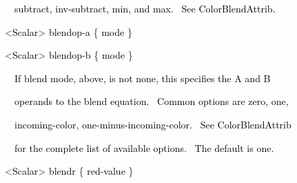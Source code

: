 \documentclass[a4paper]{article}
\newcommand\textstyleOOoComputerKeyWord[1]{\textrm{\textcolor[rgb]{0.0,0.0,0.5019608}{#1}}}
\newcommand\textstyleOOoAssemblerSpecialChar[1]{\textrm{\textcolor[rgb]{0.0,0.5019608,0.0}{#1}}}
\newcommand\textstyleOOoAssemblerIdent[1]{\textrm{\textcolor{black}{#1}}}
\begin{document}
{\color{black}
\textstyleOOoComputerKeyWord{\textcolor{black}{\ \ \ \ subtract, inv-subtract, min, and max. \ See ColorBlendAttrib.}}}


\bigskip

{\color{black}
\textstyleOOoComputerKeyWord{\textcolor{black}{\ \ }}\textstyleOOoAssemblerSpecialChar{{\textless}}\textstyleOOoAssemblerIdent{Scalar}\textstyleOOoAssemblerSpecialChar{{\textgreater}}\textstyleOOoComputerKeyWord{\textcolor{black}{
}}\textstyleOOoAssemblerIdent{blendop}\textstyleOOoAssemblerSpecialChar{{}-}\textstyleOOoAssemblerIdent{a}\textstyleOOoComputerKeyWord{\textcolor{black}{
}}\textstyleOOoAssemblerSpecialChar{\{}\textstyleOOoComputerKeyWord{\textcolor{black}{
}}\textstyleOOoAssemblerIdent{mode}\textstyleOOoComputerKeyWord{\textcolor{black}{
}}\textstyleOOoAssemblerSpecialChar{\}}}

{\color{black}
\textstyleOOoComputerKeyWord{\textcolor{black}{\ \ }}\textstyleOOoAssemblerSpecialChar{{\textless}}\textstyleOOoAssemblerIdent{Scalar}\textstyleOOoAssemblerSpecialChar{{\textgreater}}\textstyleOOoComputerKeyWord{\textcolor{black}{
}}\textstyleOOoAssemblerIdent{blendop}\textstyleOOoAssemblerSpecialChar{{}-}\textstyleOOoAssemblerIdent{b}\textstyleOOoComputerKeyWord{\textcolor{black}{
}}\textstyleOOoAssemblerSpecialChar{\{}\textstyleOOoComputerKeyWord{\textcolor{black}{
}}\textstyleOOoAssemblerIdent{mode}\textstyleOOoComputerKeyWord{\textcolor{black}{
}}\textstyleOOoAssemblerSpecialChar{\}}}


\bigskip

{\color{black}
\textstyleOOoComputerKeyWord{\textcolor{black}{\ \ \ \ If blend mode, above, is not none, this specifies the A and B}}}

{\color{black}
\textstyleOOoComputerKeyWord{\textcolor{black}{\ \ \ \ operands to the blend equation. \ Common options are zero,
one,}}}

{\color{black}
\textstyleOOoComputerKeyWord{\textcolor{black}{\ \ \ \ incoming-color, one-minus-incoming-color. \ See
ColorBlendAttrib}}}

{\color{black}
\textstyleOOoComputerKeyWord{\textcolor{black}{\ \ \ \ for the complete list of available options. \ The default is
{\textquotedbl}one{\textquotedbl}.}}}


\bigskip

{\color{black}
\textstyleOOoComputerKeyWord{\textcolor{black}{\ \ }}\textstyleOOoAssemblerSpecialChar{{\textless}}\textstyleOOoAssemblerIdent{Scalar}\textstyleOOoAssemblerSpecialChar{{\textgreater}}\textstyleOOoComputerKeyWord{\textcolor{black}{
}}\textstyleOOoAssemblerIdent{blendr}\textstyleOOoComputerKeyWord{\textcolor{black}{
}}\textstyleOOoAssemblerSpecialChar{\{}\textstyleOOoComputerKeyWord{\textcolor{black}{
}}\textstyleOOoAssemblerIdent{red}\textstyleOOoAssemblerSpecialChar{{}-}\textstyleOOoAssemblerIdent{value}\textstyleOOoComputerKeyWord{\textcolor{black}{
}}\textstyleOOoAssemblerSpecialChar{\}}}
\end{document}
